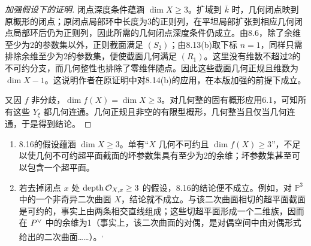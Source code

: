 \begin{proof}[加强假设下的证明]
闭点深度条件蕴涵 $\dim X\ge3$。扩域到 $\overline{k}$ 时，几何闭点映到原概形的闭点；原闭点局部环中长度为3的正则列，在平坦局部扩张到相应几何闭点局部环后仍为正则列，因此所需的几何闭点深度条件仍成立。由8.6，除了余维至少为2的参数集以外，正则截面满足 $(S_2)$；由8.13(b)取下标 $n=1$，同样只需排除余维至少为2的参数集，便使截面几何满足 $(R_1)$。这里没有维数不超过2的不可约分支，而几何整性也排除了零维伴随点。因此这些截面几何正规且维数为 $\dim X-1$。这说明作者在原证明中对8.14(b)的应用，在本版加强的前提下成立。

又因 $f$ 非分歧，$\dim f(X)=\dim X\ge3$。对几何整的固有概形应用6.1，可知所有这些 $Y_\xi$ 都几何连通。几何正规且非空的有限型概形，几何整当且仅当几何连通，于是得到结论。
\end{proof}

\begin{enumerate}
\item[(a)] 8.16的假设蕴涵 $\dim X\ge3$。单有“$X$ 几何不可约且 $\dim f(X)\ge3$”，不足以使几何不可约超平面截面的坏参数集具有至少为2的余维；坏参数集甚至可以包含一个超平面。
\item[(b)] 若去掉闭点 $x$ 处 $\operatorname{depth}\mathcal O_{X,x}\ge3$ 的假设，8.16的结论便不成立。例如，对 $\mathbb P^3$ 中的一个非奇异二次曲面 $X$，结论就不成立。与该二次曲面相切的超平面截面是可约的，事实上由两条相交直线组成；这些切超平面形成一个二维族，因而在 $P^\vee$ 中的余维为1（事实上，该二次曲面的对偶，是对偶空间中由对偶形式给出的二次曲面……）。\textsuperscript{,}
\end{enumerate}

